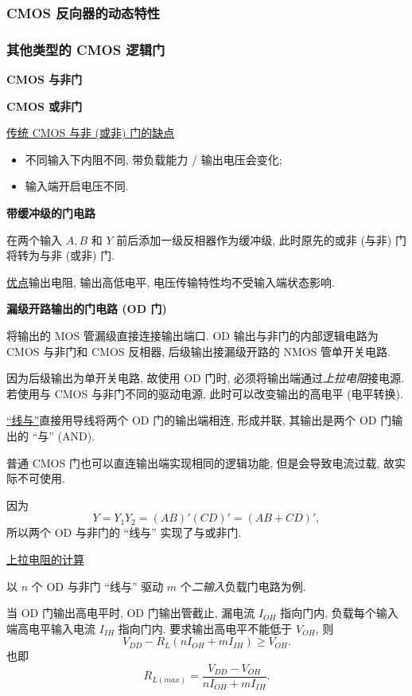 \subsubsection{CMOS 反向器的动态特性}

\subsubsection{其他类型的 CMOS 逻辑门}
\textbf{CMOS 与非门}

\textbf{CMOS 或非门}

\underline{传统 CMOS 与非 (或非) 门的缺点}
\begin{itemize}
    \item 不同输入下内阻不同, 带负载能力 / 输出电压会变化;
    \item 输入端开启电压不同.
\end{itemize}

\textbf{带缓冲级的门电路}

在两个输入 $A,B$ 和 $Y$ 前后添加一级反相器作为缓冲级, 此时原先的或非 (与非) 门将转为与非 (或非) 门.

\underline{优点}\quad 输出电阻, 输出高低电平, 电压传输特性均不受输入端状态影响.

\textbf{漏级开路输出的门电路 (OD 门)}

将输出的 MOS 管漏级直接连接输出端口. OD 输出与非门的内部逻辑电路为 CMOS 与非门和 CMOS 反相器, 后级输出接漏级开路的 NMOS 管单开关电路.

因为后级输出为单开关电路, 故使用 OD 门时, 必须将输出端通过\textit{上拉电阻}接电源. 若使用与 CMOS 与非门不同的驱动电源, 此时可以改变输出的高电平 (电平转换).

\underline{``线与''}\quad 直接用导线将两个 OD 门的输出端相连, 形成并联, 其输出是两个 OD 门输出的 ``与'' (AND).

普通 CMOS 门也可以直连输出端实现相同的逻辑功能, 但是会导致电流过载, 故实际不可使用.

因为
\begin{equation}
    Y=Y_1Y_2=(AB)'(CD)'=(AB+CD)',
\end{equation}
所以两个 OD 与非门的 ``线与'' 实现了与或非门.

\underline{上拉电阻的计算}

以 $n$ 个 OD 与非门 ``线与'' 驱动 $m$ 个\textit{二输入}负载门电路为例.

当 OD 门输出高电平时, OD 门输出管截止, 漏电流 $I_{OH}$ 指向门内, 负载每个输入端高电平输入电流 $I_{IH}$ 指向门内. 要求输出高电平不能低于 $V_{OH}$, 则
\begin{equation}
    V_{DD}-R_L(nI_{OH}+mI_{IH})\geq V_{OH}.
\end{equation}
也即
\begin{equation}
    R_{L(max)}=\frac{V_{DD}-V_{OH}}{nI_{OH}+mI_{IH}}.
\end{equation}

